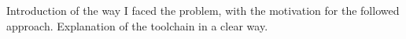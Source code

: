 Introduction of the way I faced the problem, with the motivation for the followed approach.
Explanation of the toolchain in a clear way.
